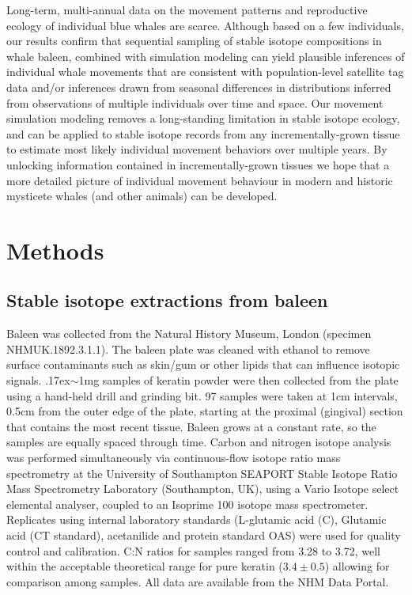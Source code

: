 \documentclass[a4paper,12pt]{article}
\begin{document}
Long-term, multi-annual data on the movement patterns and reproductive ecology of individual blue whales are scarce. 
Although based on a few individuals, our results confirm that sequential sampling of stable isotope compositions in whale baleen, combined with simulation modeling can yield plausible inferences of individual whale movements that are consistent with population-level satellite tag data and/or inferences drawn from seasonal differences in distributions inferred from observations of multiple individuals over time and space. 
Our movement simulation modeling removes a long-standing limitation in stable isotope ecology, and can be applied to stable isotope records from any incrementally-grown tissue to estimate most likely individual movement behaviors over multiple years. 
By unlocking information contained in incrementally-grown tissues we hope that a more detailed picture of individual movement behaviour in modern and historic mysticete whales (and other animals) can be developed.

\section{Methods}\label{methods}

\subsection{Stable isotope extractions from baleen}\label{stable-isotope-extractions-from-baleen}

Baleen was collected from the Natural History Museum, London (specimen NHMUK.1892.3.1.1). 
The baleen plate was cleaned with ethanol to remove surface contaminants such as skin/gum or other lipids that can influence isotopic signals. 
{\raise.17ex\hbox{$\scriptstyle\sim$}}1mg samples of keratin powder were then collected from the plate using a hand-held drill and grinding bit. 
97 samples were taken at 1cm intervals, 0.5cm from the outer edge of the plate, starting at the proximal (gingival) section that contains the most recent tissue. 
Baleen grows at a constant rate, so the samples are equally spaced through time\cite{best1996stable}. 
Carbon and nitrogen isotope analysis was performed simultaneously via continuous-flow isotope ratio mass spectrometry at the University of Southampton SEAPORT Stable Isotope Ratio Mass Spectrometry Laboratory (Southampton, UK), using a Vario Isotope select elemental analyser, coupled to an Isoprime 100 isotope mass spectrometer. 
Replicates using internal laboratory standards (L-glutamic acid (C), Glutamic acid (CT standard), acetanilide and protein standard OAS) were used for quality control and calibration. 
C:N ratios for samples ranged from 3.28\text{\textperthousand} to 3.72\text{\textperthousand}, well within the acceptable theoretical range for pure keratin ($3.4\pm0.5$) allowing for comparison among samples\cite{hobson1998stable}. 
All data are available from the NHM Data Portal\cite{data-set}.
\end{document}

